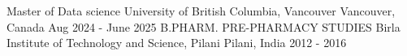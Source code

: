 

\begin{cventries}

  \cventry
  {Master of Data science} %
  {University of British Columbia, Vancouver} %
  {Vancouver, Canada} %
  {Aug 2024 - June 2025} %
  {}
\vspace{2em}
\cventry
{B.PHARM. PRE-PHARMACY STUDIES} %
    {Birla Institute of Technology and Science, Pilani} %
    {Pilani, India} %
    {2012 - 2016} %
    {}
\end{cventries}
